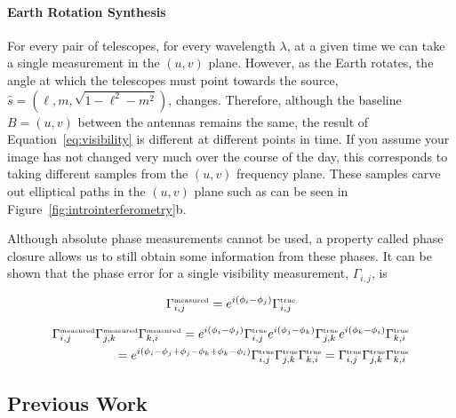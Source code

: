 \paragraph{Earth Rotation Synthesis}

For every pair of telescopes, for every wavelength $\lambda$, at a given time we can take a single measurement in the $(u,v)$ plane. However, as the Earth rotates, the angle at which the telescopes must point towards the source, $\hat{s} = (\ell, m, \sqrt{1 - \ell^2 - m^2} )$, changes. Therefore, although the baseline $B=(u,v)$ between the antennas remains the same, the result of Equation~\ref{eq:visibility} is different at different points in time. If you assume your image has not changed very much over the course of the day, this corresponds to taking different samples from the $(u,v)$ frequency plane. These samples carve out elliptical paths in the $(u,v)$ plane such as can be seen in Figure~\ref{fig:introinterferometry}b.  


Although absolute phase measurements cannot be used, a property called phase closure allows us to still obtain some information from these phases. It can be shown that the phase error for a single visibility measurement, $\Gamma_{i,j}$, is 

\begin{equation} \Gamma_{i,j}^{\mbox{\tiny{measured}}} = e^{i(\phi_i - \phi_j)}\Gamma_{i,j}^{\mbox{\tiny{true}}} \end{equation}


\begin{align}  
\notag \Gamma^{\mbox{\tiny{measured}}}_{i,j}\Gamma^{\mbox{\tiny{measured}}}_{j,k}\Gamma^{\mbox{\tiny{measured}}}_{k,i} = e^{i(\phi_i-\phi_j)}\Gamma^{\mbox{\tiny{true}}}_{i,j}e^{i(\phi_j-\phi_k)}\Gamma^{\mbox{\tiny{true}}}_{j,k}e^{i(\phi_k-\phi_i)}\Gamma^{\mbox{\tiny{true}}}_{k,i} \\
= e^{i(\phi_i-\phi_j+\phi_j-\phi_k + \phi_k-\phi_i)}\Gamma^{\mbox{\tiny{true}}}_{i,j}\Gamma^{\mbox{\tiny{true}}}_{j,k}\Gamma^{\mbox{\tiny{true}}}_{k,i} =\Gamma^{\mbox{\tiny{true}}}_{i,j}\Gamma^{\mbox{\tiny{true}}}_{j,k}\Gamma^{\mbox{\tiny{true}}}_{k,i} 
\label{eq:phaseclosure}
 \end{align}




\subsection{Previous Work}